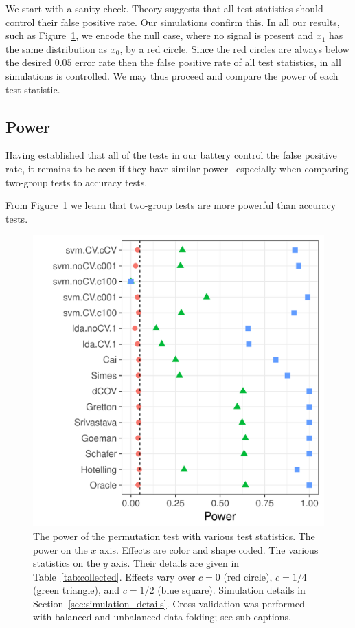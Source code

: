 \documentclass[journal]{IEEEtran}
\begin{document}
We start with a sanity check. 
Theory suggests that all test statistics should control their false positive rate. 
Our simulations confirm this.
In all our results, such as Figure~\ref{fig:simulation_1}, we encode the null case, where no signal is present and $x_1$ has the same distribution as $x_0$, by a red circle. 
Since the red circles are always below the desired $0.05$ error rate then the false positive rate of all test statistics, in all simulations is controlled. 
We may thus proceed and compare the power of each test statistic. 






\subsection{Power}
\label{sec:power}

Having established that all of the tests in our battery control the false positive rate, it remains to be seen if they have similar power-- especially when comparing two-group tests to accuracy tests. 

From Figure~\ref{fig:simulation_1} we learn that two-group tests are more powerful than accuracy tests.

\begin{figure}[h]
	\centering
	\includegraphics[width=0.7\columnwidth]{"art/file2"}
	\caption{
		The power of the permutation test with various test statistics. 
		The power on the $x$ axis. 
		Effects are color and shape coded. 
		The various statistics on the $y$ axis. 
		Their details are given in Table~\ref{tab:collected}. 
		Effects vary over $c=0$ (red circle), $c=1/4$ (green triangle), and $c=1/2$ (blue square). 
		Simulation details in Section~\ref{sec:simulation_details}.
		Cross-validation was performed with balanced and unbalanced data folding; see sub-captions.}	
	\label{fig:simulation_1}
\end{figure}
\end{document}

